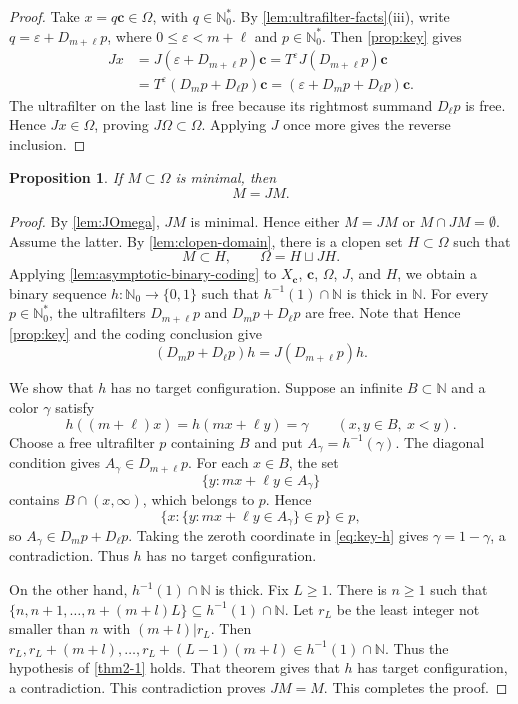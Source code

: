 \documentclass[reqno,12pt]{amsart}
\newtheorem{prop}[thm]{Proposition}
\newcommand{\Nzero}{\mathbb N_0}
\newcommand{\Nstar}{\Nzero^{*}}
\def \N {\mathbb N}
\numberwithin{equation}{section}
\begin{document}
\begin{proof}
Take $x=q\mathbf c\in\Omega$, with $q\in\Nstar$. By
\cref{lem:ultrafilter-facts}(iii), write
$q=\varepsilon+D_{m+\ell} p$, where $0\leq\varepsilon<m+\ell$ and $p\in\Nstar$. Then \cref{prop:key} gives
\[
 \begin{aligned}
 Jx
 &=J(\varepsilon+D_{m+\ell} p)\mathbf c
  =T^\varepsilon J(D_{m+\ell} p)\mathbf c\\
 &=T^\varepsilon(D_m p+D_\ell p)\mathbf c
  =(\varepsilon+D_m p+D_\ell p)\mathbf c.
 \end{aligned}
\]
The ultrafilter on the last line is free because its rightmost summand
$D_\ell p$ is free. Hence $Jx\in\Omega$, proving $J\Omega\subset\Omega$.
Applying $J$ once more gives the reverse inclusion.
\end{proof}

\begin{prop}\label{prop:MJM}
If $M\subset\Omega$ is minimal, then
\[
 M=JM.
\]
\end{prop}

\begin{proof}
By \cref{lem:JOmega}, $JM$ is minimal. Hence either $M=JM$ or
$M\cap JM=\emptyset$. Assume the latter. By
\cref{lem:clopen-domain}, there is a clopen set $H\subset\Omega$ such
that
\[
 M\subset H,
 \qquad
 \Omega=H\sqcup JH.
\]
Applying \cref{lem:asymptotic-binary-coding} to $X_{\mathbf c}$, $\mathbf c$,
$\Omega$, $J$, and $H$, we obtain a binary sequence
$h:\Nzero\to\{0,1\}$ such that $h^{-1}(1)\cap\N$ is thick in $\N$. For every
$p\in\Nstar$, the ultrafilters $D_{m+\ell}p$ and
$D_mp+D_\ell p$ are free. Note that  Hence \cref{prop:key} and the coding
conclusion give
\begin{equation}\label{eq:key-h}
 (D_m p+D_\ell p)h=J(D_{m+\ell} p)h.
\end{equation}

We show that $h$ has no target configuration. Suppose an infinite
$B\subset\N$ and a color $\gamma$ satisfy
\[
 h((m+\ell)x)=h(mx+\ell y)=\gamma
 \qquad(x,y\in B,\ x<y).
\]
Choose a free ultrafilter $p$ containing $B$ and put
$A_\gamma=h^{-1}(\gamma)$. The diagonal condition gives
$A_\gamma\in D_{m+\ell} p$. For each $x\in B$, the set
\[
 \{y:mx+\ell y\in A_\gamma\}
\]
contains $B\cap(x,\infty)$, which belongs to $p$. Hence
\[
 \{x:\{y:mx+\ell y\in A_\gamma\}\in p\}\in p,
\]
so $A_\gamma\in D_m p+D_\ell p$. Taking the zeroth coordinate in
\eqref{eq:key-h} gives $\gamma=1-\gamma$, a contradiction.  Thus $h$ has no target
configuration.

On the other hand, $h^{-1}(1)\cap\N$ is thick. Fix $L\geq1$. There is $n\geq1$
	such that
	$
	\{n,n+1,\ldots,n+(m+l)L\}\subseteq h^{-1}(1)\cap\N$.
	Let $r_L$ be the least integer not smaller than $n$ with $(m+l)|r_L$.  Then
	$
	r_L,r_L+(m+l),\ldots,r_L+(L-1)(m+l)\in h^{-1}(1)\cap\N.
	$
Thus the hypothesis of \cref{thm2-1} holds.  That theorem gives  that $h$ has target configuration, a contradiction. 
This
contradiction proves
$JM=M$. This completes the proof.
\end{proof}
\end{document}
